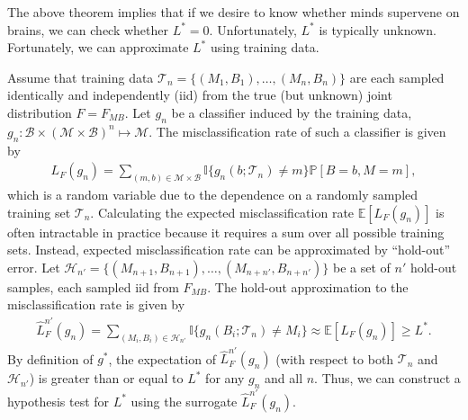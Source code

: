 \documentclass{article}
\newcommand{\mB}{\mathcal{B}}
\newcommand{\mM}{\mathcal{M}}
\newcommand{\PP}{\mathbb{P}}           %
\newcommand{\EE}{\mathbb{E}}           %
\newcommand{\II}{\mathbb{I}}           %
\providecommand{\mc}[1]{\mathcal{#1}}
\newcommand{\hL}{\widehat{L}}
\begin{document}

The above theorem implies that if we desire to know whether  minds supervene on brains, we can check whether $L^*=0$.  Unfortunately, $L^*$ is typically unknown.  Fortunately, we can approximate $L^*$ using training data.

Assume that training data $\mc{T}_n=\{(M_{1},B_{1}), \ldots, (M_{n},B_{n})\}$ are each sampled identically and independently (iid) from the true (but unknown) joint distribution $F=F_{MB}$.  Let $g_n$ be a classifier induced by the training data, $g_n:\mB \times (\mc{M} \times \mc{B})^n \mapsto \mM$.  The  misclassification rate of such a classifier is given by
\begin{align}
L_F(g_n)=\sum_{(m,b)  \in \mc{M}\times \mc{B}} \II\{g_n(b; \mc{T}_n) \neq m\} \PP[B=b,M=m],
\end{align}
which is a random variable due to the dependence on a randomly sampled training set $\mc{T}_n$.  
Calculating the expected misclassification rate $\EE[L_F(g_n)]$ is often intractable in practice because it requires a sum over all possible training sets.  Instead, expected misclassification rate can be approximated by ``hold-out'' error.  Let $\mc{H}_{n'}=\{(M_{n+1},B_{n+1}), \ldots, (M_{n+n'},B_{n+n'})\}$ be a set of $n'$ hold-out samples, each sampled iid from $F_{MB}$.  The hold-out approximation to the misclassification rate is given by
\begin{align}
\hL^{n'}_{F}(g_{n}) = \sum_{(M_i,B_i) \in \mc{H}_{n'}}\II \{g_{n}(B_i; \mc{T}_{n})\neq M_i\} \approx \EE[L_F(g_n)] \geq L^*. %
\end{align}
By definition of $g^*$, the expectation of $\hL^{n'}_F(g_n)$ (with respect to both $\mc{T}_n$ and $\mc{H}_{n'}$)  is greater than or equal to $L^*$ for any $g_n$ and all $n$.  Thus, we can construct a hypothesis test for $L^*$ using the surrogate $\hL^{n'}_F(g_n)$.  
\end{document}
